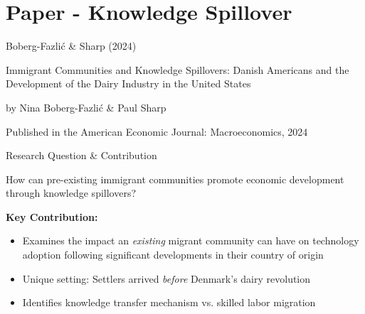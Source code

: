 \documentclass{beamer}
\begin{document}
\section{Paper - Knowledge Spillover}

\begin{frame}{Boberg-Fazlić \& Sharp (2024)}
\begin{center}
    \begin{Large}
        Immigrant Communities and Knowledge Spillovers: Danish Americans and the Development of the Dairy Industry in the United States \\
    \end{Large}
    \begin{large}
        by Nina Boberg-Fazlić \& Paul Sharp  \\
    \end{large}
    Published in the American Economic Journal: Macroeconomics, 2024
\end{center}    
\end{frame}

\begin{frame}{Research Question \& Contribution}
\begin{tcolorbox}
    How can pre-existing immigrant communities promote economic development through knowledge spillovers?
\end{tcolorbox}
\textbf{Key Contribution:}
\begin{itemize}
    \item Examines the impact an \textit{existing} migrant community can have on technology adoption following significant developments in their country of origin
    \item Unique setting: Settlers arrived \textit{before} Denmark's dairy revolution
    \item Identifies knowledge transfer mechanism vs. skilled labor migration
\end{itemize}
\end{frame}
\end{document}
